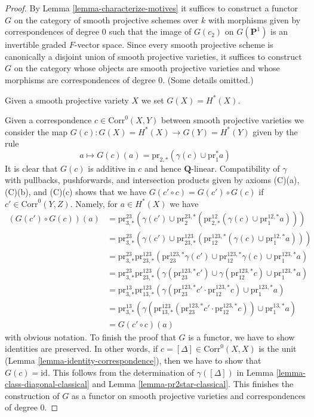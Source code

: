 \begin{proof}
By Lemma \ref{lemma-characterize-motives} it suffices to construct a functor
$G$ on the category of smooth projective schemes over $k$
with morphisms given by correspondences of degree $0$ such that
the image of $G(c_2)$ on $G(\mathbf{P}^1)$ is an invertible graded
$F$-vector space.
Since every smooth projective scheme is canonically a disjoint
union of smooth projective varieties, it suffices to construct
$G$ on the category whose objects are smooth projective varieties
and whose morphisms are correspondences of degree $0$. (Some details
omitted.)

\medskip\noindent
Given a smooth projective variety $X$ we set $G(X) = H^*(X)$.

\medskip\noindent
Given a correspondence $c \in \text{Corr}^0(X, Y)$ between smooth
projective varieties we consider the map
$G(c) : G(X) = H^*(X) \to G(Y) = H^*(Y)$ given by the rule
$$
a \longmapsto
G(c)(a) = \text{pr}_{2, *}(\gamma(c) \cup \text{pr}_1^*a)
$$
It is clear that $G(c)$ is additive in $c$ and hence $\mathbf{Q}$-linear.
Compatibility of $\gamma$ with pullbacks, pushforwards, and
intersection products given by axioms (C)(a), (C)(b), and (C)(c)
shows that we have
$G(c' \circ c) = G(c') \circ G(c)$ if $c' \in \text{Corr}^0(Y, Z)$.
Namely, for $a \in H^*(X)$ we have
\begin{align*}
(G(c') \circ G(c))(a)
& =
\text{pr}^{23}_{3, *}(\gamma(c') \cup
\text{pr}^{23, *}_2(\text{pr}^{12}_{2, *}(\gamma(c) \cup
\text{pr}^{12, *}_1a))) \\
& =
\text{pr}^{23}_{3, *}(\gamma(c') \cup
\text{pr}^{123}_{23, *}(\text{pr}^{123, *}_{12}(\gamma(c) \cup
\text{pr}^{12, *}_1 a))) \\
& =
\text{pr}^{23}_{3, *}
\text{pr}^{123}_{23, *}(
\text{pr}^{123, *}_{23}\gamma(c') \cup
\text{pr}^{123, *}_{12}\gamma(c) \cup
\text{pr}^{123, *}_1 a) \\
& =
\text{pr}^{23}_{3, *}
\text{pr}^{123}_{23, *}(
\gamma(\text{pr}^{123, *}_{23}c') \cup
\gamma(\text{pr}^{123, *}_{12}c) \cup
\text{pr}^{123, *}_1 a) \\
& =
\text{pr}^{13}_{3, *}
\text{pr}^{123}_{13, *}(
\gamma(\text{pr}^{123, *}_{23}c' \cdot \text{pr}^{123, *}_{12}c) \cup
\text{pr}^{123, *}_1 a) \\
& =
\text{pr}^{13}_{3, *}(
\gamma(\text{pr}^{123}_{13, *}(\text{pr}^{123, *}_{23}c' \cdot \text{pr}^{123, *}_{12}c)) \cup
\text{pr}^{13, *}_1 a) \\
& =
G(c' \circ c)(a)
\end{align*}
with obvious notation. To finish the proof that $G$ is a functor,
we have to show identities are preserved. In other words, if
$c = [\Delta] \in \text{Corr}^0(X, X)$ is the unit
(Lemma \ref{lemma-identity-correspondence}), then we have to show that
$G(c) = \text{id}$. This follows from the determination
of $\gamma([\Delta])$ in Lemma \ref{lemma-class-diagonal-classical}
and Lemma \ref{lemma-pr2star-classical}.
This finishes the construction of $G$ as a functor on
smooth projective varieties and correspondences of degree $0$.


\end{proof}
